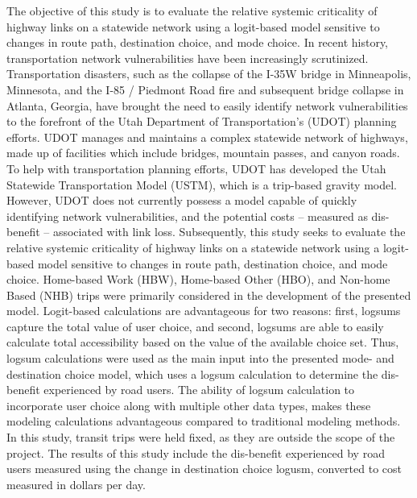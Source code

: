 \afterpage{\cleardoublepage}

The objective of this study is to evaluate the relative systemic
criticality of highway links on a statewide network using a logit-based model
sensitive to changes in route path, destination choice, and mode choice.
In recent history, transportation network vulnerabilities have been increasingly
scrutinized. Transportation disasters, such as the collapse of the I-35W
bridge in Minneapolis, Minnesota, and the I-85 / Piedmont Road fire
and subsequent bridge collapse in Atlanta, Georgia, have brought the need to easily identify
network vulnerabilities to the forefront of the Utah Department of Transportation's
(UDOT) planning efforts. UDOT manages and maintains a complex statewide network of highways,
made up of facilities which include bridges, mountain passes, and canyon roads.
To help with transportation planning efforts, UDOT has developed the Utah
Statewide Transportation Model (USTM), which is a trip-based gravity model. However,
UDOT does not currently possess a model capable of quickly identifying network
vulnerabilities, and the potential costs -- measured as dis-benefit -- associated with link loss.
Subsequently, this study seeks to evaluate the relative systemic
criticality of highway links on a statewide network using a logit-based model
sensitive to changes in route path, destination choice, and mode choice.
Home-based Work (HBW), Home-based Other (HBO), and Non-home Based (NHB)
trips were primarily considered in the development of the presented model.
Logit-based calculations are advantageous for two reasons: first,
logsums capture the total value of user choice, and second, logsums are able to easily
calculate total accessibility based on the value of the available choice set. Thus, logsum
calculations were used as the main input into the presented mode- and destination choice
model, which uses a logsum calculation to determine the dis-benefit experienced
by road users. The ability of logsum calculation to incorporate user choice
along with multiple other data types, makes these modeling calculations
advantageous compared to traditional modeling methods. In this study, transit trips were held
fixed, as they are outside the scope of the project. The results of this study
include the dis-benefit experienced by road users measured using the
change in destination choice logusm, converted to cost measured in dollars per day.
